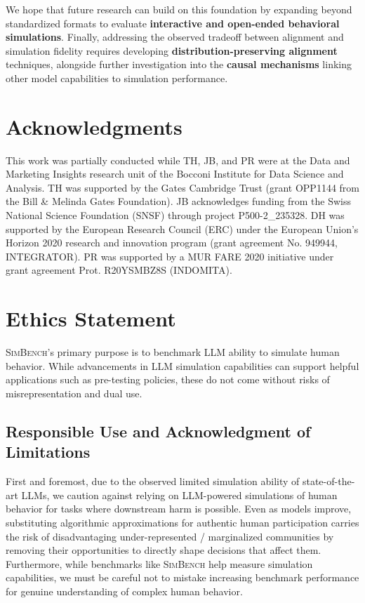 \documentclass{article} %
\begin{document}
We hope that future research can build on this foundation by expanding beyond standardized formats to evaluate \textbf{interactive and open-ended behavioral simulations}. Finally, addressing the observed tradeoff between alignment and simulation fidelity requires developing \textbf{distribution-preserving alignment} techniques, alongside further investigation into the \textbf{causal mechanisms} linking other model capabilities to simulation performance.

\section*{Acknowledgments}
This work was partially conducted while TH, JB, and PR were at the Data and Marketing Insights research unit of the Bocconi Institute for Data Science and Analysis. TH was supported by the Gates Cambridge Trust (grant OPP1144 from the Bill \& Melinda Gates Foundation). JB acknowledges funding from the Swiss National Science Foundation (SNSF) through project P500-2\_235328. DH was supported by the European Research Council (ERC) under the European Union's Horizon 2020 research and innovation program (grant agreement No. 949944, INTEGRATOR). PR was supported by a MUR FARE 2020 initiative under grant agreement Prot. R20YSMBZ8S (INDOMITA).

 
\newpage
\section*{Ethics Statement}
\label{ethics}

\textsc{SimBench}'s primary purpose is to benchmark LLM ability to simulate human behavior.
While advancements in LLM simulation capabilities can support helpful applications such as pre-testing policies, these do not come without risks of misrepresentation and dual use.

\subsection*{Responsible Use and Acknowledgment of Limitations}
First and foremost, due to the observed limited simulation ability of state-of-the-art LLMs, we caution against relying on LLM-powered simulations of human behavior for tasks where downstream harm is possible.
Even as models improve, substituting algorithmic approximations for authentic human participation carries the risk of disadvantaging under-represented / marginalized communities by removing their opportunities to directly shape decisions that affect them.
Furthermore, while benchmarks like \textsc{SimBench} help measure simulation capabilities, we must be careful not to mistake increasing benchmark performance for genuine understanding of complex human behavior.
\end{document}
